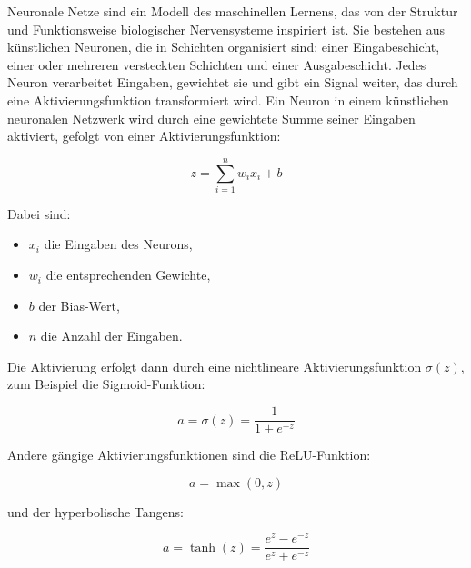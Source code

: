 Neuronale Netze sind ein Modell des maschinellen Lernens, das von der Struktur und Funktionsweise biologischer Nervensysteme inspiriert ist. Sie bestehen aus künstlichen Neuronen, die in Schichten organisiert sind: einer Eingabeschicht, einer oder mehreren versteckten Schichten und einer Ausgabeschicht. Jedes Neuron verarbeitet Eingaben, gewichtet sie und gibt ein Signal weiter, das durch eine Aktivierungsfunktion transformiert wird.
Ein Neuron in einem künstlichen neuronalen Netzwerk wird durch eine gewichtete Summe seiner Eingaben aktiviert, gefolgt von einer Aktivierungsfunktion:

\begin{equation}
    z = \sum_{i=1}^{n} w_i x_i + b
\end{equation}

Dabei sind:
\begin{itemize}
    \item $x_i$ die Eingaben des Neurons,
    \item $w_i$ die entsprechenden Gewichte,
    \item $b$ der Bias-Wert,
    \item $n$ die Anzahl der Eingaben.
\end{itemize}

Die Aktivierung erfolgt dann durch eine nichtlineare Aktivierungsfunktion $\sigma(z)$, zum Beispiel die Sigmoid-Funktion:

\begin{equation}
    a = \sigma(z) = \frac{1}{1 + e^{-z}}
\end{equation}

Andere gängige Aktivierungsfunktionen sind die ReLU-Funktion:

\begin{equation}
    a = \max(0, z)
\end{equation}

und der hyperbolische Tangens:

\begin{equation}
    a = \tanh(z) = \frac{e^z - e^{-z}}{e^z + e^{-z}}
\end{equation}
